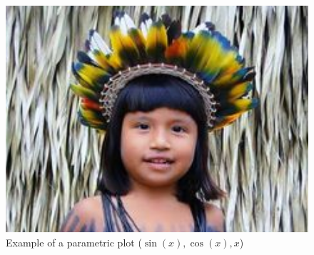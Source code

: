 \documentclass[10pt,a4paper]{article}
\begin{document}
\printtitle 
\printauthor


\lipsum[1]


      \captionsetup{margin=10pt,
                  font=small,
                  labelfont=bf,
                  labelsep=endash}
      \renewcommand{\imagewidthdefault}{1\textwidth}

      \renewcommand{\xmlcaption}[2]{\caption{#2}}         %
      
      \begin{figure}[h]                                                       %
      \label{f01}
      \includegraphics[width=\imagewidthdefault]{elemento-fig-example.jpg}    %
      \xmlcaption{Figura 1}{Example of 
                        a parametric plot ($\sin (x), \cos(x), x$)}           %
      \end{figure}
      



\lipsum
%
\end{document}

